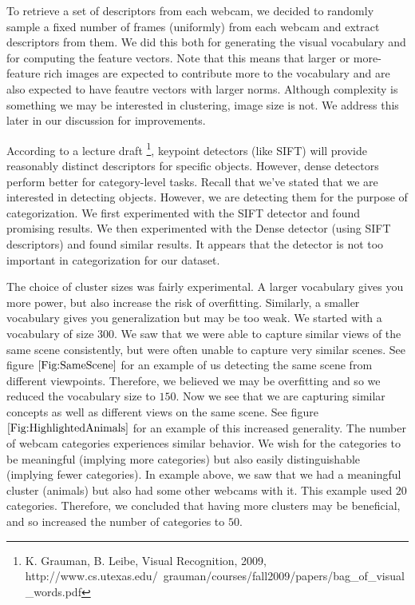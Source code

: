 \documentclass{article}
\begin{document}
To retrieve a set of descriptors from each webcam, we decided to randomly
sample a fixed number of frames (uniformly) from each webcam and extract
descriptors from them. We did this both for generating the visual vocabulary
and for computing the feature vectors. Note that this means that larger or
more-feature rich images are expected to contribute more to the vocabulary and
are also expected to have feautre vectors with larger norms. Although
complexity is something we may be interested in clustering, image size is not.
We address this later in our discussion for improvements.

According to a lecture draft \footnote{K. Grauman, B. Leibe, Visual
Recognition, 2009,
http://www.cs.utexas.edu/~grauman/courses/fall2009/papers/bag\_of\_visual\_words.pdf},
keypoint detectors (like SIFT) will provide reasonably distinct descriptors for
specific objects. However, dense detectors perform better for category-level
tasks. Recall that we've stated that we are interested in detecting objects.
However, we are detecting them for the purpose of categorization. We first
experimented with the SIFT detector and found promising results. We then
experimented with the Dense detector (using SIFT descriptors) and found similar
results. It appears that the detector is not too important in categorization
for our dataset.

The choice of cluster sizes was fairly experimental. A larger vocabulary gives
you more power, but also increase the risk of overfitting. Similarly, a smaller
vocabulary gives you generalization but may be too weak. We started with a
vocabulary of size $300$. We saw that we were able to capture similar views of
the same scene consistently, but were often unable to capture very similar
scenes. See figure $\ref{Fig:SameScene}$ for an example of us detecting the
same scene from different viewpoints. Therefore, we believed we may be
overfitting and so we reduced the vocabulary size to $150$.  Now we see that we
are capturing similar concepts as well as different views on the same scene.
See figure $\ref{Fig:HighlightedAnimals}$ for an example of this increased
generality. The number of webcam categories experiences similar behavior. We
wish for the categories to be meaningful (implying more categories) but also
easily distinguishable (implying fewer categories). In example above, we saw
that we had a meaningful cluster (animals) but also had some other webcams with
it. This example used $20$ categories. Therefore, we concluded that having more
clusters may be beneficial, and so increased the number of categories to $50$.
\end{document}
